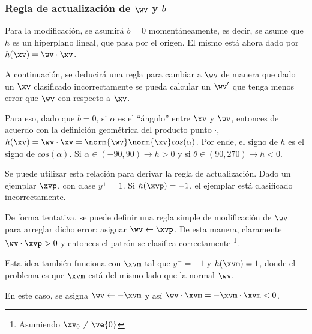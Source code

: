 \subsubsection{Regla de actualización de $\wv$ y $b$ }

Para la modificación, se asumirá $b=0$ momentáneamente, es decir, se asume que $h$ es un hiperplano lineal, que pasa por el origen. El mismo está ahora dado por $h(\xv)=\wv \cdot \xv$.

A continuación, se deducirá una regla para cambiar a $\wv$ de manera que dado un $\xv$ clasificado incorrectamente se pueda calcular un $\wv'$ que tenga menos error que $\wv$ con respecto a $\xv$. 

Para eso, dado que $b=0$, si $\alpha$ es el ``ángulo'' entre $\xv$ y $\wv$, entonces de acuerdo con la definición geométrica del producto punto $\cdot$, $h(\xv)=\wv \cdot \xv= \norm{\wv} \norm{\xv} cos(\alpha)$. Por ende, el signo de $h$ es el signo de $cos(\alpha)$. Si $\alpha \in (-90,90) \rightarrow h>0$ y si $\theta \in (90,270) \rightarrow h < 0 $. 


Se puede utilizar esta relación para derivar la regla de actualización. Dado un ejemplar $\xvp$, con clase $y^{+}=1$. Si $h(\xvp)=-1$, el ejemplar está clasificado incorrectamente. 


De forma tentativa, se puede definir una regla simple de modificación de $\wv$ para arreglar dicho error: asignar $\wv \leftarrow \xvp$. De esta manera, claramente $\wv \cdot \xvp>0 $ y entonces el patrón se clasifica correctamente \footnote{Asumiendo $\xv_0 \neq \ve{0}$}. 


Esta idea también funciona con $\xvm$ tal que $y^{-}=-1$ y $h(\xvm)=1$, donde el problema es que $\xvm$ está del mismo lado que la normal $\wv$.


En este caso, se asigna $\wv \leftarrow -\xvm$ y así $\wv \cdot \xvm = -\xvm \cdot \xvm <0$.

